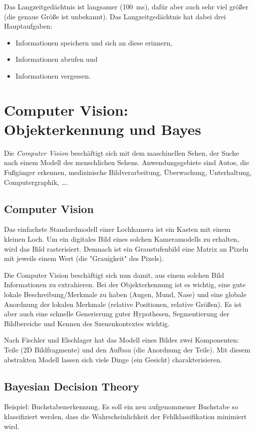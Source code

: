 			Das Langzeitgedächtnis ist langsamer (\ca \SI{100}{\milli\second}), dafür aber auch sehr viel größer (die genaue Größe ist unbekannt). Das Langzeitgedächtnis hat dabei drei Hauptaufgaben:
			\begin{itemize}
				\item Informationen speichern und sich an diese erinnern,
				\item Informationen abrufen und
				\item Informationen vergessen.
			\end{itemize}

\chapter{Computer Vision: Objekterkennung und Bayes}
	Die \emph{Computer Vision} beschäftigt sich mit dem maschinellen Sehen, \dh der Suche nach einem Modell des menschlichen Sehens. Anwendungsgebiete sind \bspw Autos, die Fußgänger erkennen, medizinische Bildverarbeitung, Überwachung, Unterhaltung, Computergraphik, \dots.

	\section{Computer Vision}
		Das einfachste Standardmodell einer Lochkamera ist ein Kasten mit einem kleinen Loch. Um ein digitales Bild eines solchen Kameramodells zu erhalten, wird das Bild rasterisiert. Demnach ist ein Graustufenbild eine Matrix an Pixeln mit jeweils einem Wert (die "Grauigkeit" des Pixels).
		
		Die Computer Vision beschäftigt sich nun damit, aus einem solchen Bild Informationen zu extrahieren. Bei der Objekterkennung ist es wichtig, eine gute lokale Beschreibung/Merkmale zu haben (\zB Augen, Mund, Nase) und eine globale Anordnung der lokalen Merkmale (\zB relative Positionen, relative Größen). Es ist aber auch eine schnelle Generierung guter Hypothesen, Segmentierung der Bildbereiche und Kennen des Szenenkontextes wichtig.
		
		Nach Fischler und Elschlager hat das Modell eines Bildes zwei Komponenten: Teile (2D Bildfragmente) und den Aufbau (die Anordnung der Teile). Mit diesem abstrakten Modell lassen sich viele Dinge (\zB ein Gesicht) charakterisieren.

	\section{Bayesian Decision Theory}
		Beispiel: Buchstabenerkennung. Es soll ein neu aufgenommener Buchstabe so klassifiziert werden, dass die Wahrscheinlichkeit der Fehlklassifikation minimiert wird.

